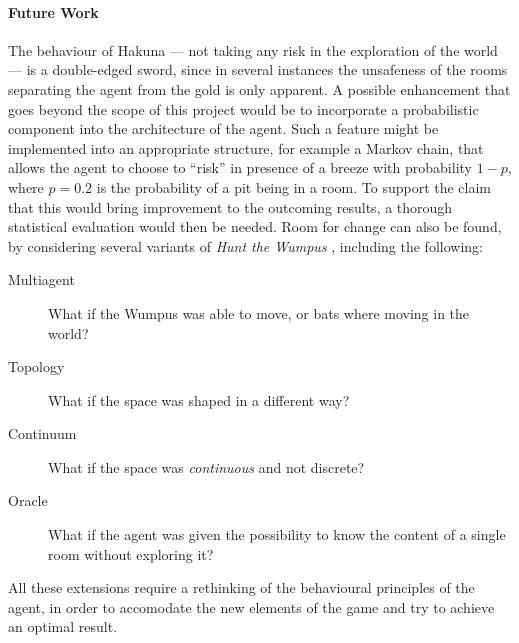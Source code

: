 \documentclass{llncs}
\newcommand{\htw}{\emph{Hunt the Wumpus }}
\begin{document}
\paragraph{Future Work} The behaviour of Hakuna --- not taking any risk in the exploration of the world --- is a double-edged sword, since in several instances the unsafeness of the rooms separating the agent from the gold is only apparent.
A possible enhancement that goes beyond the scope of this project would be to incorporate a probabilistic component into the architecture of the agent.
Such a feature might be implemented into an appropriate structure, for example a Markov chain, that allows the agent to choose to \enquote{risk} in presence of a breeze with probability $1 - p$, where $p = 0.2$ is the probability of a pit being in a room.
To support the claim that this would bring improvement to the outcoming results, a thorough statistical evaluation would then be needed.
Room for change can also be found, by considering several variants of \htw, including the following:
\begin{description}
	\item[Multiagent] What if the Wumpus was able to move, or bats where moving in the world?
	\item[Topology] What if the space was shaped in a different way?
	\item[Continuum] What if the space was \emph{continuous} and not discrete?
	\item[Oracle] What if the agent was given the possibility to know the content of a single room without exploring it?
\end{description}
All these extensions require a rethinking of the behavioural principles of the agent, in order to accomodate the new elements of the game and try to achieve an optimal result.



\newpage
{}
\appendix
\footnotesize

\begin{multicols}{2}

\end{multicols}
\end{document}

